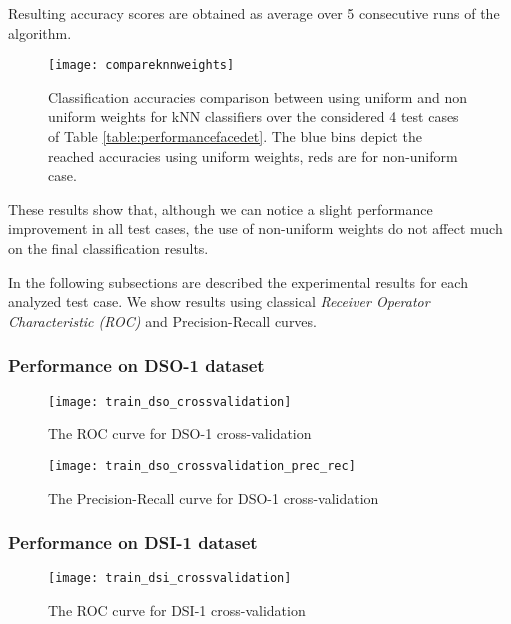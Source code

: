 Resulting accuracy scores are obtained as average over 5 consecutive runs of the algorithm. 

\begin{figure}[h!]
  \centering
    \texttt{[image: compareknnweights]}
    \caption{Classification accuracies comparison between using uniform and non uniform weights for kNN classifiers over the considered 4 test cases of Table \ref{table:performancefacedet}. The blue bins depict the reached accuracies using uniform weights, reds are for non-uniform case.}
    \label{fig:compareknnweights}
\end{figure}

These results show that, although we can notice a slight performance improvement in all test cases, the use of non-uniform weights do not affect much on the final classification results.

In the following subsections are described the experimental results for each analyzed test case. We show results using classical \emph{Receiver Operator Characteristic (ROC)} \cite{fawcett2006introduction} and Precision-Recall curves\cite{Davis:2006:RPR:1143844.1143874}. 

\subsubsection{Performance on DSO-1 dataset}


\begin{figure}[h!]
  \centering
    \texttt{[image: train\_dso\_crossvalidation]}
    \caption{The ROC curve  for DSO-1 cross-validation}
    \label{fig:train_dso_crossvalidation}
\end{figure}

\begin{figure}[h!]
  \centering
    \texttt{[image: train\_dso\_crossvalidation\_prec\_rec]}
    \caption{The Precision-Recall curve for DSO-1 cross-validation}
    \label{fig:train_dso_crossvalidation_prec_rec}
\end{figure}

\subsubsection{Performance on DSI-1 dataset}

\begin{figure}[h!]
  \centering
    \texttt{[image: train\_dsi\_crossvalidation]}
    \caption{The ROC curve  for DSI-1 cross-validation}
    \label{fig:train_dsi_crossvalidation}
\end{figure}

